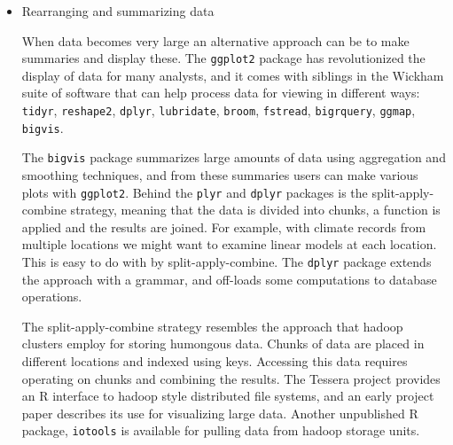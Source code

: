 \documentclass{article}
\begin{document}
\begin{itemize}
\item Rearranging and summarizing data

When data becomes very large an alternative approach can be to make summaries and display these. The {\tt ggplot2} package has revolutionized the display of data for many analysts, and it comes with siblings in the Wickham suite of software that can help process data for viewing in different ways: {\tt tidyr}, {\tt reshape2}, {\tt dplyr}, {\tt lubridate}, {\tt broom}, {\tt fstread}, {\tt bigrquery}, {\tt ggmap}, {\tt bigvis}.

The {\tt bigvis} package \citep{bigvis} summarizes large amounts of data using aggregation and smoothing techniques, and from these summaries users can make various plots with {\tt ggplot2}. Behind the {\tt plyr} \citep{plyr} and {\tt dplyr} \citep{dplyr} packages is the split-apply-combine strategy, meaning that the data is divided into chunks, a function is applied and the results are joined. For example, with climate records from multiple locations we might want to examine linear models at each location. This is easy to do with by split-apply-combine. The {\tt dplyr} package extends the approach with a grammar, and off-loads some computations to database operations.

The split-apply-combine strategy resembles the approach that hadoop \citep{hadoop} clusters employ for storing humongous data. Chunks of data are placed in different locations and indexed using keys. Accessing this data requires operating on chunks and combining the results. The Tessera project \citep{tessera} provides an R interface to hadoop style distributed file systems, and an early project paper \citep{guha} describes its use for visualizing large data. Another unpublished R package, {\tt iotools} \citep{urbanek} is available for pulling data from hadoop storage units.



\end{itemize}
\end{document}
